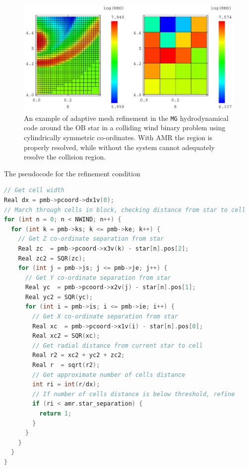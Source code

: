 \begin{figure}
  \centering
  \includegraphics[width=5in]{assets/mergecellc.pdf}
  \caption[Adaptive mesh refinement comparison]{An example of adaptive mesh refinement in the \texttt{MG} hydrodynamical code around the OB star in a colliding wind binary problem using cylindrically symmetric co-ordinates. With AMR the region is properly resolved, while without the system cannot adequately resolve the collision region.}
  \label{fig:mgrefine}
\end{figure}

The pseudocode for the refinement condition 


\begin{lstlisting}[language=C++]
// Get cell width
Real dx = pmb->pcoord->dx1v(0);
// March through cells in block, checking distance from star to cell
for (int n = 0; n < NWIND; n++) {
  for (int k = pmb->ks; k <= pmb->ke; k++) {
    // Get Z co-ordinate separation from star
    Real zc  = pmb->pcoord->x3v(k) - star[n].pos[2];
    Real zc2 = SQR(zc);
    for (int j = pmb->js; j <= pmb->je; j++) {
      // Get Y co-ordinate separation from star
      Real yc  = pmb->pcoord->x2v(j) - star[n].pos[1];
      Real yc2 = SQR(yc);
      for (int i = pmb->is; i <= pmb->ie; i++) {
        // Get X co-ordinate separation from star
        Real xc  = pmb->pcoord->x1v(i) - star[n].pos[0];
        Real xc2 = SQR(xc);
        // Get radial distance from current star to cell
        Real r2 = xc2 + yc2 + zc2;
        Real r  = sqrt(r2);
        // Get approximate number of cells distance
        int ri = int(r/dx);
        // If number of cells distance is below threshold, refine
        if (ri < amr.star_separation) {
          return 1;
        }
      }
    }
  }
}
\end{lstlisting}

